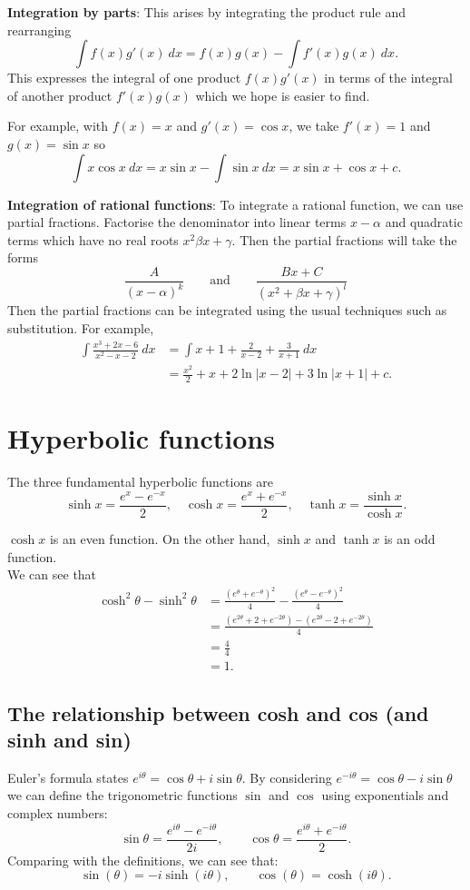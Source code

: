 \documentclass[10pt, a4paper]{article}
\begin{document}
\textbf{Integration by parts}: This arises by integrating the product rule and rearranging
\[
\int f(x)g'(x)\ dx = f(x)g(x) - \int f'(x)g(x)\ dx.
\]
This expresses the integral of one product $f(x)g'(x)$ in terms of the integral of another product $f'(x)g(x)$ which we hope is easier to find.

For example, with $f(x) = x$ and $g'(x) = \cos x$, we take $f'(x) = 1$ and $g(x) = \sin x$ so
\[
\int x\cos x\ dx = x\sin x - \int \sin x\ dx = x\sin x + \cos x + c.
\]

\textbf{Integration of rational functions}: To integrate a rational function, we can use partial fractions. Factorise the denominator into linear terms $x - \alpha$ and quadratic terms which have no real roots $x ^ 2 \beta x + \gamma$. Then the partial fractions will take the forms
\[
\frac{A}{(x - \alpha) ^ k}\qquad\text{and}\qquad\frac{Bx + C}{(x ^ 2 + \beta x + \gamma) ^ l}
\]
Then the partial fractions can be integrated using the usual techniques such as substitution. For example,
\begin{align*}
\int \frac{x ^ 3 + 2x - 6}{x ^ 2 - x - 2}\ dx &= \int x + 1 + \frac{2}{x - 2} + \frac{3}{x + 1}\ dx \\
&= \frac{x ^ 2}{2} + x + 2\ln |x - 2| + 3\ln |x + 1| + c.
\end{align*}

\newpage

\section{Hyperbolic functions}
The three fundamental hyperbolic functions are
\[
\sinh x = \frac{e ^ x - e ^ {-x}}{2},\quad\cosh x = \frac{e ^ x + e ^ {-x}}{2},\quad\tanh x = \frac{\sinh x}{\cosh x}.
\]

$\cosh x$ is an even function. On the other hand, $\sinh x$ and $\tanh x$ is an odd function. \\
We can see that 
\begin{align*}
    \cosh ^ 2 \theta - \sinh ^ 2 \theta &= \frac{(e ^ \theta + e ^ {-\theta}) ^ 2}{4} - \frac{(e ^ \theta - e ^ {-\theta}) ^ 2}{4} \\
    &= \frac{(e ^ {2\theta} + 2 + e ^ {-2\theta}) - (e ^ {2\theta} - 2 + e ^ {-2\theta})}{4} \\
    &= \frac{4}{4} \\
    &= 1.
\end{align*}

\subsection{The relationship between cosh and cos (and sinh and sin)}
Euler's formula states $e ^ {i\theta} = \cos \theta + i\sin \theta$. By considering $e ^ {-i\theta} = \cos \theta - i\sin \theta$ we can define the trigonometric functions $\sin$ and $\cos$ using exponentials and complex numbers:
\[
\sin \theta = \frac{e ^ {i\theta} - e ^ {-i\theta}}{2i},\qquad\cos \theta = \frac{e ^ {i\theta} + e ^ {-i\theta}}{2}.
\]
Comparing with the definitions, we can see that:
\[
\sin (\theta) = -i\sinh (i\theta),\qquad\cos (\theta) = \cosh (i\theta).
\]
\end{document}
